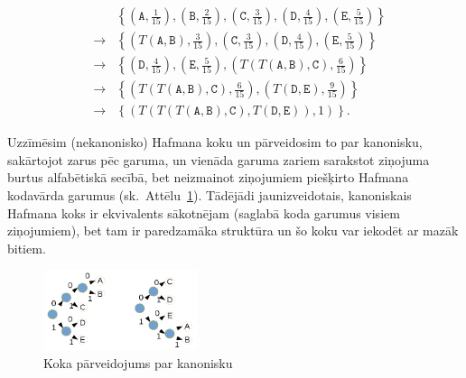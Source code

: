 \documentclass[11pt]{article}
\begin{document}
\begin{eqnarray}
 & & \left\{ \left( \mathtt{A}, \frac{1}{15} \right), \left( \mathtt{B}, \frac{2}{15} \right), \left( \mathtt{C}, \frac{3}{15} \right),
\left( \mathtt{D}, \frac{4}{15} \right), \left( \mathtt{E}, \frac{5}{15} \right) \right\} \\
 & \rightarrow & \left\{ \left( T(\mathtt{A},\mathtt{B}), \frac{3}{15} \right), \left( \mathtt{C}, \frac{3}{15} \right),
\left( \mathtt{D}, \frac{4}{15} \right), \left( \mathtt{E}, \frac{5}{15} \right) \right\} \\
 & \rightarrow & \left\{ \left( \mathtt{D}, \frac{4}{15} \right), \left( \mathtt{E}, \frac{5}{15} \right),
\left( T(T(\mathtt{A},\mathtt{B}), \mathtt{C}), \frac{6}{15} \right) \right\} \\
 & \rightarrow & \left\{ \left( T(T(\mathtt{A},\mathtt{B}), \mathtt{C}), \frac{6}{15} \right), \left( T(\mathtt{D},\mathtt{E}), \frac{9}{15} \right) \right\} \\
 & \rightarrow & \left\{ \left( T( T(T(\mathtt{A},\mathtt{B}), \mathtt{C}), T(\mathtt{D},\mathtt{E})), 1 \right) \right\}.
\end{eqnarray}

Uzzīmēsim (nekanonisko) Hafmana koku un pārveidosim to par kanonisku, sakārtojot zarus pēc garuma, un vienāda garuma zariem sarakstot
ziņojuma burtus alfabētiskā secībā, bet neizmainot ziņojumiem piešķirto Hafmana kodavārda garumus (sk.\ Attēlu~\ref{fig:huffman-canonical}). 
Tādējādi jaunizveidotais, kanoniskais Hafmana koks
ir ekvivalents sākotnējam (saglabā koda garumus visiem ziņojumiem), bet tam ir paredzamāka
struktūra un šo koku var iekodēt ar mazāk bitiem.

\begin{figure}[h!]
\begin{center}
\includegraphics[width=0.4\textwidth]{fall2019-midterm/huffman-canonical.png}
\caption{Koka pārveidojums par kanonisku\label{fig:huffman-canonical}}
\end{center}
\end{figure}
\end{document}
